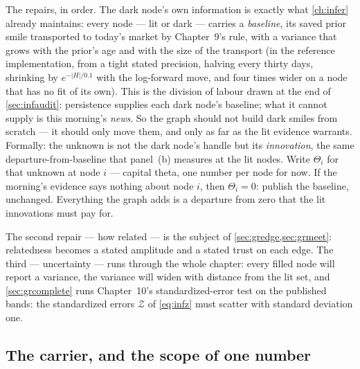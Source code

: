 The repairs, in order.  The dark node's own information is exactly
what \cref{ch:infer} already maintains: every node --- lit or dark ---
carries a \emph{baseline}, its saved prior smile transported to
today's market by Chapter~9's rule, with a variance that grows with
the prior's age and with the size of the transport (in the reference
implementation, from a tight stated precision, halving every thirty
days, shrinking by $e^{-|H|/0.1}$ with the log-forward move, and four
times wider on a node that has no fit of its own).  This is the division of labour drawn at the end
of \cref{sec:infaudit}: persistence supplies each dark node's
baseline; what it cannot supply is this morning's \emph{news}.  So the
graph should not build dark smiles from scratch --- it should only move
them, and only as far as the lit evidence warrants.  Formally: the
unknown is not the dark node's handle but its \emph{innovation}, the
same departure-from-baseline that panel~(b) measures at the lit nodes.
Write $\Theta_i$ for that unknown at node $i$ --- capital theta, one
number per node for now.  If the morning's evidence says nothing about
node $i$, then $\Theta_i=0$: publish the baseline,
unchanged.  Everything the graph adds is a departure from zero that
the lit innovations must pay for.

The second repair --- how related --- is the subject of
\cref{sec:gredge,sec:grmeet}: relatedness becomes a stated amplitude
and a stated trust on each edge.  The third --- uncertainty --- runs
through the whole chapter: every filled node will report a variance,
the variance will widen with distance from the lit set, and
\cref{sec:grcomplete} runs Chapter~10's standardized-error test on
the published bands: the standardized errors $\mathcal{Z}$ of
\cref{eq:infz} must scatter with standard deviation one.

\subsection{The carrier, and the scope of one number}

